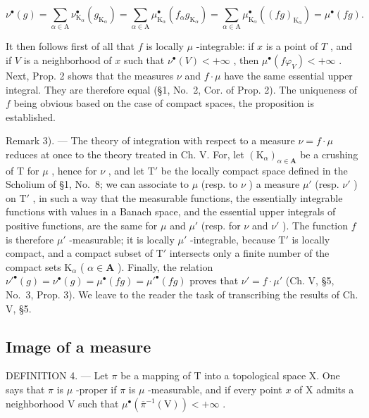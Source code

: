 \[
\nu^ {\bullet} (g) = \sum_ {\alpha \in \mathrm{A}} \nu_ {\mathrm{K} _ {\alpha}} ^ {\bullet} \left(g _ {\mathrm{K} _ {\alpha}}\right) = \sum_ {\alpha \in \mathrm{A}} \mu_ {\mathrm{K} _ {\alpha}} ^ {\bullet} \left(f _ {\alpha} g _ {\mathrm{K} _ {\alpha}}\right) = \sum_ {\alpha \in \mathrm{A}} \mu_ {\mathrm{K} _ {\alpha}} ^ {\bullet} ((f g) _ {\mathrm{K} _ {\alpha}}) = \mu^ {\bullet} (f g).
\]

It then follows first of all that \(f\) is locally \(\mu\) -integrable: if \(x\) is a point of \(T\) , and if \(V\) is a neighborhood of \(x\) such that \(\nu^{\bullet}(V) < +\infty\) , then \(\mu^{\bullet}(f\varphi_V) < +\infty\) . Next, Prop. 2 shows that the measures \(\nu\) and \(f \cdot \mu\) have the same essential upper integral. They are therefore equal (§1, No.~2, Cor. of Prop. 2). The uniqueness of \(f\) being obvious based on the case of compact spaces, the proposition is established.

Remark 3). --- The theory of integration with respect to a measure \(\nu = f \cdot \mu\) reduces at once to the theory treated in Ch. V. For, let \((\mathrm{K}_{\alpha})_{\alpha \in \mathbf{A}}\) be a crushing of T for \(\mu\) , hence for \(\nu\) , and let \(\mathrm{T}'\) be the locally compact space defined in the Scholium of §1, No.~8; we can associate to \(\mu\) (resp. to \(\nu\) ) a measure \(\mu'\) (resp. \(\nu'\) ) on \(\mathrm{T}'\) , in such a way that the measurable functions, the essentially integrable functions with values in a Banach space, and the essential upper integrals of positive functions, are the same for \(\mu\) and \(\mu'\) (resp. for \(\nu\) and \(\nu'\) ). The function \(f\) is therefore \(\mu'\) -measurable; it is locally \(\mu'\) -integrable, because \(\mathrm{T}'\) is locally compact, and a compact subset of \(\mathrm{T}'\) intersects only a finite number of the compact sets \(\mathrm{K}_{\alpha}\) ( \(\alpha \in \mathbf{A}\) ). Finally, the relation \(\nu'^{\bullet}(g) = \nu^{\bullet}(g) = \mu^{\bullet}(fg) = \mu'^{\bullet}(fg)\) proves that \(\nu' = f \cdot \mu'\) (Ch. V, §5, No.~3, Prop. 3). We leave to the reader the task of transcribing the results of Ch. V, §5.

\subsection{Image of a measure}

DEFINITION 4. --- Let \(\pi\) be a mapping of T into a topological space X. One says that \(\pi\) is \(\mu\) -proper if \(\pi\) is \(\mu\) -measurable, and if every point \(x\) of X admits a neighborhood V such that \(\mu^{\bullet}\left(\overline{\pi}^{-1}(\mathrm{V})\right) < +\infty\) .

